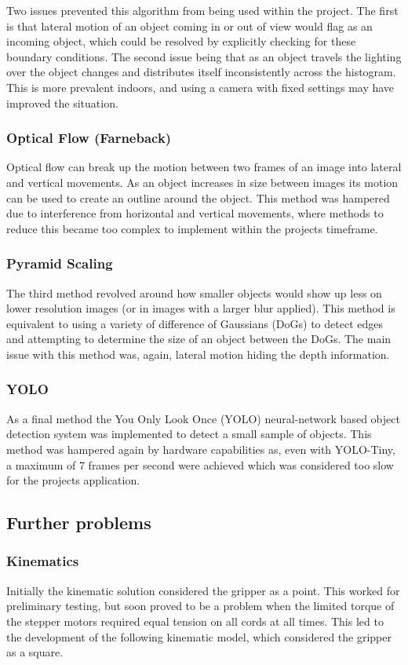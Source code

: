 \documentclass[conference]{IEEEtran}
\begin{document}
	Two issues prevented this algorithm from being used within the project. The first is that lateral motion of an object coming in or out of view would flag as an incoming object, which could be resolved by explicitly checking for these boundary conditions. The second issue being that as an object travels the lighting over the object changes and distributes itself inconsistently across the histogram. This is more prevalent indoors, and using a camera with fixed settings may have improved the situation.
	
	\subsubsection{Optical Flow (Farneback)}
	Optical flow can break up the motion between two frames of an image into lateral and vertical movements. As an object increases in size between images its motion can be used to create an outline around the object. This method was hampered due to interference from horizontal and vertical movements, where methods to reduce this became too complex to implement within the projects timeframe.
	
	\subsubsection{Pyramid Scaling}
	The third method revolved around how smaller objects would show up less on lower resolution images (or in images with a larger blur applied). This method is equivalent to using a variety of difference of Gaussians (DoGs) to detect edges and attempting to determine the size of an object between the DoGs. The main issue with this method was, again, lateral motion hiding the depth information.
	
	\subsubsection{YOLO}
	As a final method the You Only Look Once (YOLO) neural-network based object detection system was implemented to detect a small sample of objects. This method was hampered again by hardware capabilities as, even with YOLO-Tiny, a maximum of 7 frames per second were achieved which was considered too slow for the projects application. 
	\subsection{Further problems}
	\subsubsection{Kinematics} \label{kinematic_solution_3}
	Initially the kinematic solution considered the gripper as a point. This worked for preliminary testing, but soon proved to be a problem when the limited torque of the stepper motors required equal tension on all cords at all times. This led to the development of the following kinematic model, which considered the gripper as a square. 
	
\end{document}
